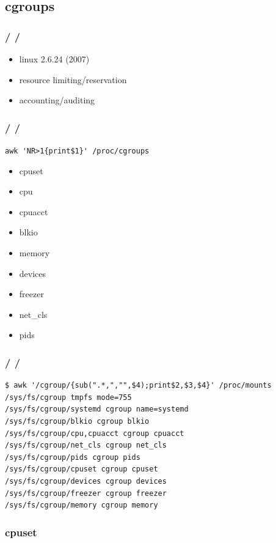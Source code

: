 \documentclass{beamer}
\newcommand{\autotitle}
{\frametitle{
    \secname
    \ifx\insertsubsection\empty
    \else
        /\subsecname
        \ifx\insertsubsubsection\empty\else/\subsubsecname\fi
    \fi}}
\begin{document}
\subsection{cgroups}

\begin{frame}
    \autotitle
    \begin{itemize}
        \item linux 2.6.24 (2007)
        \item resource limiting/reservation
        \item accounting/auditing
    \end{itemize}
\end{frame}

\begin{frame}[fragile]
    \autotitle
    \verb|awk 'NR>1{print$1}' /proc/cgroups|
    \begin{multicols}{3}
        \begin{itemize}
            \item cpuset
            \item cpu
            \item cpuacct
            \item blkio
            \item memory
            \item devices
            \item freezer
            \item net\_cls
            \item pids
        \end{itemize}
    \end{multicols}
\end{frame}

\begin{frame}[fragile]
    \autotitle
    \begin{verbatim}
$ awk '/cgroup/{sub(".*,","",$4);print$2,$3,$4}' /proc/mounts
/sys/fs/cgroup tmpfs mode=755
/sys/fs/cgroup/systemd cgroup name=systemd
/sys/fs/cgroup/blkio cgroup blkio
/sys/fs/cgroup/cpu,cpuacct cgroup cpuacct
/sys/fs/cgroup/net_cls cgroup net_cls
/sys/fs/cgroup/pids cgroup pids
/sys/fs/cgroup/cpuset cgroup cpuset
/sys/fs/cgroup/devices cgroup devices
/sys/fs/cgroup/freezer cgroup freezer
/sys/fs/cgroup/memory cgroup memory
    \end{verbatim}
\end{frame}

\subsubsection{cpuset}
\end{document}
